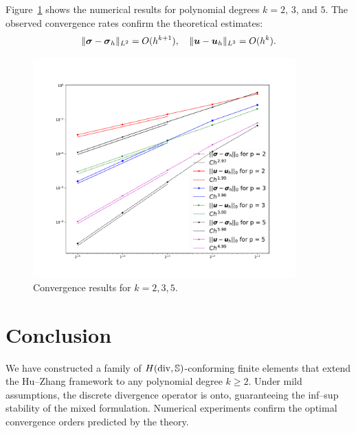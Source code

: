 \documentclass[letterpaper,12pt]{article}
\begin{document}
Figure~\ref{fig:k235} shows the numerical results for polynomial degrees $k = 2$, $3$, and $5$. The observed convergence rates confirm the theoretical estimates:
\[
\|\boldsymbol{\sigma} - \boldsymbol{\sigma}_h\|_{L^2} = O(h^{k+1}), \quad
\|\boldsymbol{u} - \boldsymbol{u}_h\|_{L^2} = O(h^k).
\]



\begin{figure}[htb]
\centering
\includegraphics[width=0.9\textwidth]{figures/divs.pdf}
\caption{Convergence results for $k=2,3,5$.}\label{fig:k235}
\end{figure}



\section{Conclusion}
We have constructed a family of $H(\mathop{\mathrm{div}},\mathbb{S})$-conforming finite elements
that extend the Hu–Zhang framework to any polynomial degree $k\ge2$.
Under mild assumptions, the discrete divergence operator is onto,
guaranteeing the inf–sup stability of the mixed formulation.
Numerical experiments confirm the optimal convergence orders
predicted by the theory.



\end{document}
